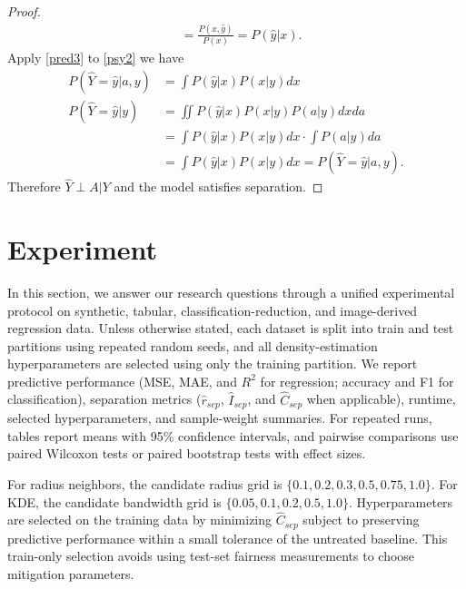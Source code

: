 \begin{proof}
\begin{equation}
\begin{aligned}
&= \frac{P(x,\hat{y})}{P(x)}  = P(\hat{y}|x).
\end{aligned}
\end{equation}
Apply \eqref{pred3} to \eqref{psy2} we have
\begin{equation}
\label{psy3}
\begin{aligned}
P(\hat{Y}=\hat{y} | a, y) &= \int P(\hat{y} | x)P(x|y)dx\\
P(\hat{Y}=\hat{y} | y) &= \iint P(\hat{y} | x)P(x|y)P(a|y) dxda\\ 
&= \int P(\hat{y} | x)P(x|y)dx \cdot \int P(a|y) da \\
&=\int P(\hat{y} | x)P(x|y) dx = P(\hat{Y}=\hat{y} | a, y).
\end{aligned}
\end{equation}
Therefore $\hat{Y}\perp A|Y$ and the model satisfies separation. 
\end{proof}



\section{Experiment}
\label{sect:Experiments}

In this section, we answer our research questions through a unified experimental protocol on synthetic, tabular, classification-reduction, and image-derived regression data. Unless otherwise stated, each dataset is split into train and test partitions using repeated random seeds, and all density-estimation hyperparameters are selected using only the training partition. We report predictive performance (MSE, MAE, and $R^2$ for regression; accuracy and F1 for classification), separation metrics ($\hat{r}_{sep}$, $\hat{I}_{sep}$, and $\hat{C}_{sep}$ when applicable), runtime, selected hyperparameters, and sample-weight summaries. For repeated runs, tables report means with 95\% confidence intervals, and pairwise comparisons use paired Wilcoxon tests or paired bootstrap tests with effect sizes.

For radius neighbors, the candidate radius grid is $\{0.1,0.2,0.3,0.5,0.75,1.0\}$. For KDE, the candidate bandwidth grid is $\{0.05,0.1,0.2,0.5,1.0\}$. Hyperparameters are selected on the training data by minimizing $\hat{C}_{sep}$ subject to preserving predictive performance within a small tolerance of the untreated baseline. This train-only selection avoids using test-set fairness measurements to choose mitigation parameters.

